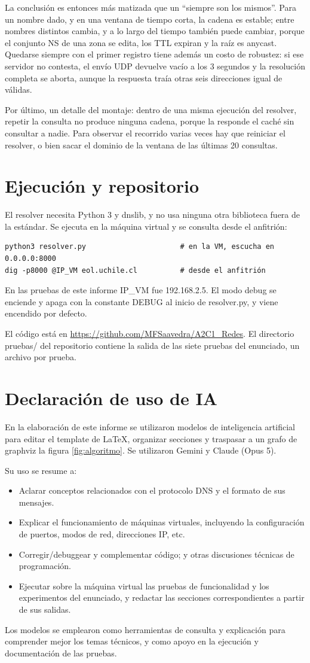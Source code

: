\documentclass[
	spanish, %
	letterpaper, oneside
]{article}
\begin{document}
La conclusión es entonces más matizada que un ``siempre son los mismos''. Para un nombre dado, y en una ventana de tiempo corta, la cadena es estable; entre nombres distintos cambia, y a lo largo del tiempo también puede cambiar, porque el conjunto NS de una zona se edita, los TTL expiran y la raíz es anycast. Quedarse siempre con el primer registro tiene además un costo de robustez: si ese servidor no contesta, el envío UDP devuelve vacío a los 3 segundos y la resolución completa se aborta, aunque la respuesta traía otras seis direcciones igual de válidas.

Por último, un detalle del montaje: dentro de una misma ejecución del resolver, repetir la consulta no produce ninguna cadena, porque la responde el caché sin consultar a nadie. Para observar el recorrido varias veces hay que reiniciar el resolver, o bien sacar el dominio de la ventana de las últimas 20 consultas.

\section{Ejecución y repositorio}
El resolver necesita Python 3 y dnslib, y no usa ninguna otra biblioteca fuera de la estándar. Se ejecuta en la máquina virtual y se consulta desde el anfitrión:

\begin{verbatim}
python3 resolver.py                      # en la VM, escucha en 0.0.0.0:8000
dig -p8000 @IP_VM eol.uchile.cl          # desde el anfitrión
\end{verbatim}

En las pruebas de este informe IP\_VM fue 192.168.2.5. El modo debug se enciende y apaga con la constante DEBUG al inicio de resolver.py, y viene encendido por defecto.

El código está en \url{https://github.com/MFSaavedra/A2C1_Redes}. El directorio pruebas/ del repositorio contiene la salida de las siete pruebas del enunciado, un archivo por prueba.

\section{Declaración de uso de IA}
En la elaboración de este informe se utilizaron modelos de inteligencia artificial para editar el template de LaTeX, organizar secciones y traspasar a un grafo de graphviz la figura \ref{fig:algoritmo}. Se utilizaron Gemini y Claude (Opus 5).

Su uso se resume a:
\begin{itemize}
	\item Aclarar conceptos relacionados con el protocolo DNS y el formato de sus mensajes.
	\item Explicar el funcionamiento de máquinas virtuales, incluyendo la configuración de puertos, modos de red, direcciones IP, etc.
	\item Corregir/debuggear y complementar código; y otras discusiones técnicas de programación.
	\item Ejecutar sobre la máquina virtual las pruebas de funcionalidad y los experimentos del enunciado, y redactar las secciones correspondientes a partir de sus salidas.
\end{itemize}

Los modelos se emplearon como herramientas de consulta y explicación para comprender mejor los temas técnicos, y como apoyo en la ejecución y documentación de las pruebas.

\end{document}
